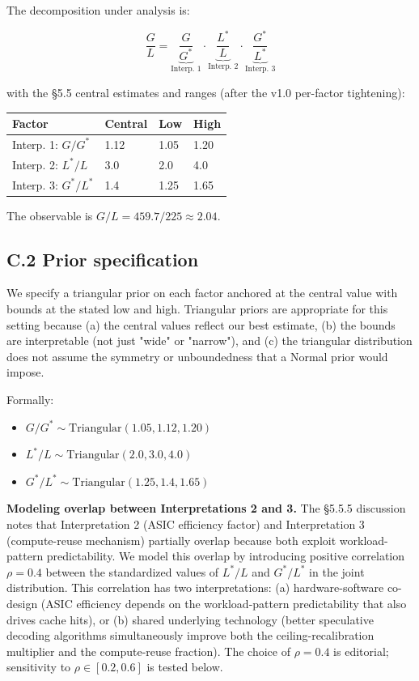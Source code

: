 \documentclass[11pt,a4paper]{article}
\begin{document}
The decomposition under analysis is:

\begin{equation*}
\frac{G}{L} = \underbrace{\frac{G}{G^{*}}}_{\text{Interp. 1}} \cdot \underbrace{\frac{L^{*}}{L}}_{\text{Interp. 2}} \cdot \underbrace{\frac{G^{*}}{L^{*}}}_{\text{Interp. 3}}
\end{equation*}

with the §5.5 central estimates and ranges (after the v1.0 per-factor tightening):

\begin{center}
\begin{tabular}{llll}
\toprule
Factor & Central & Low & High \\
\midrule
Interp. 1: $G/G^{*}$ & 1.12 & 1.05 & 1.20 \\
Interp. 2: $L^{*}/L$ & 3.0 & 2.0 & 4.0 \\
Interp. 3: $G^{*}/L^{*}$ & 1.4 & 1.25 & 1.65 \\
\bottomrule
\end{tabular}
\end{center}


The observable is $G/L = 459.7 / 225 \approx 2.04$.

\subsection{C.2 Prior specification}

We specify a triangular prior on each factor anchored at the central value with bounds at the stated low and high. Triangular priors are appropriate for this setting because (a) the central values reflect our best estimate, (b) the bounds are interpretable (not just "wide" or "narrow"), and (c) the triangular distribution does not assume the symmetry or unboundedness that a Normal prior would impose.

Formally:
\begin{itemize}
  \item $G/G^{*} \sim \text{Triangular}(1.05, 1.12, 1.20)$
  \item $L^{*}/L \sim \text{Triangular}(2.0, 3.0, 4.0)$
  \item $G^{*}/L^{*} \sim \text{Triangular}(1.25, 1.4, 1.65)$
\end{itemize}

\textbf{Modeling overlap between Interpretations 2 and 3.} The §5.5.5 discussion notes that Interpretation 2 (ASIC efficiency factor) and Interpretation 3 (compute-reuse mechanism) partially overlap because both exploit workload-pattern predictability. We model this overlap by introducing positive correlation $\rho = 0.4$ between the standardized values of $L^{*}/L$ and $G^{*}/L^{*}$ in the joint distribution. This correlation has two interpretations: (a) hardware-software co-design (ASIC efficiency depends on the workload-pattern predictability that also drives cache hits), or (b) shared underlying technology (better speculative decoding algorithms simultaneously improve both the ceiling-recalibration multiplier and the compute-reuse fraction). The choice of $\rho = 0.4$ is editorial; sensitivity to $\rho \in [0.2, 0.6]$ is tested below.
\end{document}
